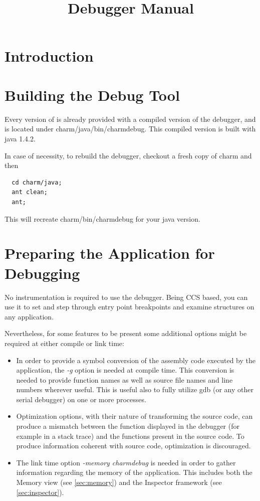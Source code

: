 \documentclass[10pt]{article}
\title{\charmpp\\ Debugger Manual}
\begin{document}
\maketitle

\section{Introduction}
\label{sec:intro}



\section{Building the \charmpp{} Debug Tool}

Every version of \charmpp{} is already provided with a compiled version
of the debugger, and is located under charm/java/bin/charmdebug. This
compiled version is built with java 1.4.2.

In case of necessity, to rebuild the debugger, checkout a fresh copy of charm
and then

\begin{verbatim}
  cd charm/java;
  ant clean;
  ant;
\end{verbatim}

This will recreate charm/bin/charmdebug for your java version.


\section{Preparing the \charmpp Application for Debugging}

No instrumentation is required to use the \charmpp{} debugger.  Being
CCS based, you can use it to set and step through entry point
breakpoints and examine \charmpp{} structures on any \charmpp{}
application.

Nevertheless, for some features to be present some additional options might
be required at either compile or link time:

\begin{itemize}

\item In order to provide a symbol conversion of the assembly code executed
by the application, the \textit{-g} option is needed at compile time. This
conversion is needed to provide function names as well as source file names
and line numbers wherever useful. This is useful also to fully utilize gdb
(or any other serial debugger) on one or more processes.

\item Optimization options, with their nature of transforming the source code,
can produce a mismatch between the function displayed in the debugger (for
example in a stack trace) and the functions present in the source code. To
produce information coherent with source code, optimization is discouraged.

\item The link time option \textit{-memory charmdebug} is needed in
order to gather information regarding the memory of the application. This
includes both the Memory view (see \ref{sec:memory}) and the Inspector
framework (see \ref{sec:inspector}).

\end{itemize}
\end{document}
